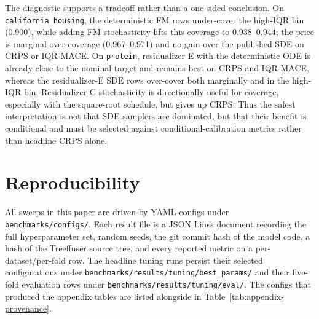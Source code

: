 \documentclass{uai2026}
\begin{document}
The diagnostic supports a tradeoff rather than a one-sided conclusion. On \texttt{california\_housing}, the deterministic FM rows under-cover the high-IQR bin (0.900), while adding FM stochasticity lifts this coverage to 0.938--0.944; the price is marginal over-coverage (0.967--0.971) and no gain over the published SDE on CRPS or IQR-MACE. On \texttt{protein}, residualizer-E with the deterministic ODE is already close to the nominal target and remains best on CRPS and IQR-MACE, whereas the residualizer-E SDE rows over-cover both marginally and in the high-IQR bin. Residualizer-C stochasticity is directionally useful for coverage, especially with the square-root schedule, but gives up CRPS. Thus the safest interpretation is not that SDE samplers are dominated, but that their benefit is conditional and must be selected against conditional-calibration metrics rather than headline CRPS alone.

\section{Reproducibility}\label{app:repro}

All sweeps in this paper are driven by YAML configs under \texttt{benchmarks/configs/}. Each result file is a JSON Lines document recording the full hyperparameter set, random seeds, the git commit hash of the model code, a hash of the Treeffuser source tree, and every reported metric on a per-dataset/per-fold row. The headline tuning runs persist their selected configurations under \texttt{benchmarks/results/tuning/best\_params/} and their five-fold evaluation rows under \texttt{benchmarks/results/tuning/eval/}. The configs that produced the appendix tables are listed alongside in Table~\ref{tab:appendix-provenance}.
\end{document}
